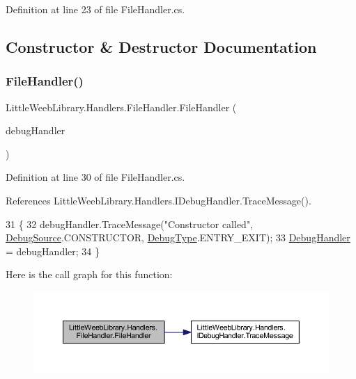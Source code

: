 Definition at line 23 of file File\+Handler.\+cs.



\subsection{Constructor \& Destructor Documentation}
\mbox{\label{class_little_weeb_library_1_1_handlers_1_1_file_handler_a2cc256d20ab33e0838e50279ee9f6fc0}} 
\subsubsection{\texorpdfstring{File\+Handler()}{FileHandler()}}
{\footnotesize\ttfamily Little\+Weeb\+Library.\+Handlers.\+File\+Handler.\+File\+Handler (\begin{DoxyParamCaption}\item[{\mbox{\hyperlink{interface_little_weeb_library_1_1_handlers_1_1_i_debug_handler}{I\+Debug\+Handler}}}]{debug\+Handler }\end{DoxyParamCaption})}



Definition at line 30 of file File\+Handler.\+cs.



References Little\+Weeb\+Library.\+Handlers.\+I\+Debug\+Handler.\+Trace\+Message().


\begin{DoxyCode}
31         \{
32             debugHandler.TraceMessage(\textcolor{stringliteral}{"Constructor called"}, \mbox{\hyperlink{namespace_little_weeb_library_1_1_handlers_a2a6ca0775121c9c503d58aa254d292be}{DebugSource}}.CONSTRUCTOR, 
      \mbox{\hyperlink{namespace_little_weeb_library_1_1_handlers_ab66019ed40462876ec4e61bb3ccb0a62}{DebugType}}.ENTRY\_EXIT);
33             \mbox{\hyperlink{class_little_weeb_library_1_1_handlers_1_1_file_handler_a131760e1828cd7ae1df2e90e9f300426}{DebugHandler}} = debugHandler;
34         \}
\end{DoxyCode}
Here is the call graph for this function\+:\nopagebreak
\begin{figure}[H]
\begin{center}
\leavevmode
\includegraphics[width=350pt]{class_little_weeb_library_1_1_handlers_1_1_file_handler_a2cc256d20ab33e0838e50279ee9f6fc0_cgraph}
\end{center}
\end{figure}


